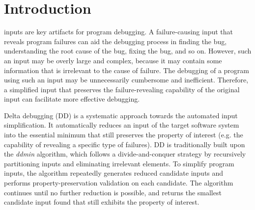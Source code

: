\section{Introduction}
 inputs are key artifacts for program debugging.
A failure-causing input that reveals program failures can aid the debugging process in finding the bug, understanding the root cause of the bug, fixing the bug, and so on.
However, such an input may be overly large and complex, because 
it may contain some information that is irrelevant to the cause of failure.
The debugging of a program using such an input may be unnecessarily cumbersome and inefficient.
Therefore, a simplified input that preserves the failure-revealing capability of the original input can facilitate more effective debugging.


Delta debugging (DD) \cite{Zeller2002, zeller2009programs, zeller2025simplifying} is a systematic approach towards the automated input simplification.
It automatically reduces an input of the target software system into the essential minimum that still preserves the property of interest (e.g. the capability of revealing a specific type of failures).
DD is traditionally built upon the \emph{ddmin} algorithm, which follows a divide-and-conquer strategy by recursively partitioning inputs and eliminating irrelevant elements.
To simplify program inputs, the algorithm repeatedly generates reduced candidate inputs and performs property-preservation validation on each candidate. 
The algorithm continues until no further reduction is possible, and returns the smallest candidate input found that still exhibits the property of interest.

